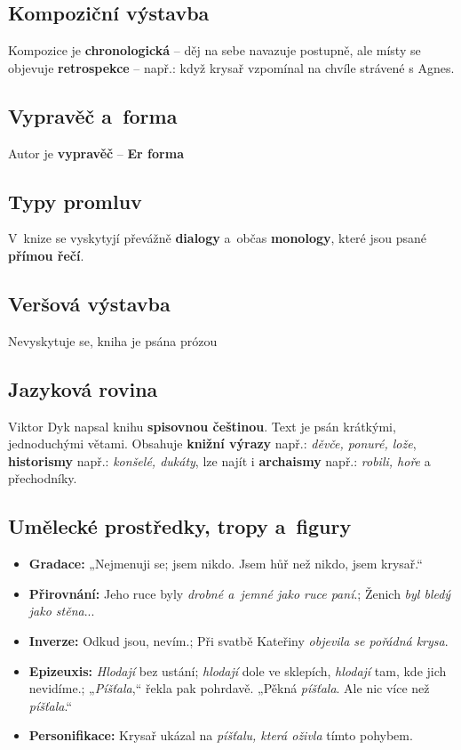 \subsection{Kompoziční výstavba}
Kompozice je \textbf{chronologická} -- děj na sebe navazuje postupně, ale místy se objevuje \textbf{retrospekce} -- např.: když krysař vzpomínal na chvíle strávené s Agnes.

\subsection{Vypravěč a~forma}
Autor je \textbf{vypravěč} -- \textbf{Er forma}

\subsection{Typy promluv}
V~knize se vyskytyjí převážně \textbf{dialogy} a~občas \textbf{monology}, které jsou psané \textbf{přímou řečí}.

\subsection{Veršová výstavba}
Nevyskytuje se, kniha je psána prózou

\subsection{Jazyková rovina}
Viktor Dyk napsal knihu \textbf{spisovnou češtinou}. Text je psán krátkými, jednoduchými větami. Obsahuje \textbf{knižní výrazy} např.: \textit{děvče, ponuré, lože}, \textbf{historismy} např.: \textit{konšelé, dukáty},  lze najít i \textbf{archaismy} např.: \textit{robili, hoře} a přechodníky.

\subsection{Umělecké prostředky, tropy a~figury}
\begin{itemize}
    \item \textbf{Gradace:} „Nejmenuji se; jsem nikdo. Jsem hůř než nikdo, jsem krysař.“
    \item \textbf{Přirovnání:} Jeho ruce byly \textit{drobné a~jemné jako ruce paní}.; Ženich \textit{byl bledý jako stěna}...
    \item \textbf{Inverze:} Odkud jsou, nevím.; Při svatbě Kateřiny \textit{objevila se pořádná krysa}.
	\item \textbf{Epizeuxis:} \textit{Hlodají} bez ustání; \textit{hlodají} dole ve sklepích, \textit{hlodají} tam, kde jich nevidíme.; „\textit{Píšťala},“ řekla pak pohrdavě. „Pěkná \textit{píšťala}. Ale nic více než \textit{píšťala}.“
	\item \textbf{Personifikace:} Krysař ukázal na \textit{píšťalu, která oživla} tímto pohybem.
\end{itemize}

